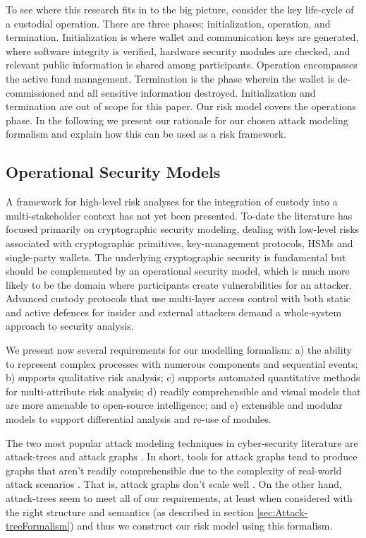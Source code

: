 \documentclass[runningheads]{llncs}
\begin{document}
To see where this research fits in to the big picture, consider the key life-cycle of a custodial operation. There are three phases; initialization, operation, and termination. Initialization is where wallet and communication keys are generated, where software integrity is verified, hardware security modules are checked, and relevant public information is shared among participants. Operation encompasses the active fund management. Termination is the phase wherein the wallet is de-commissioned and all sensitive information destroyed. Initialization and termination are out of scope for this paper. Our risk model covers the operations phase. In the following we present our rationale for our chosen attack modeling formalism and explain how this can be used as a risk framework.

\subsection{Operational Security Models}

A framework for high-level risk analyses for the integration of custody into a multi-stakeholder context has not yet been presented. To-date the literature has focused primarily on cryptographic security modeling, dealing with low-level risks associated with cryptographic primitives, key-management protocols, HSMs and single-party wallets. The underlying cryptographic security is fundamental but should be complemented by an operational security model, which is much more likely to be the domain where participants create vulnerabilities for an attacker. Advanced custody protocols that use multi-layer access control with both static and active defences for insider and external attackers demand a whole-system approach to security analysis.

We present now several requirements for our modelling formalism: a) the ability to represent complex processes with numerous components and sequential events; b) supports qualitative risk analysis; c) supports automated quantitative methods for multi-attribute risk analysis; d) readily comprehensible and visual models that are more amenable to open-source intelligence; and e) extensible and modular models to support differential analysis and re-use of modules.  

The two most popular attack modeling techniques in cyber-security literature are attack-trees and attack graphs \cite{AGraphATreeReview}. In short, tools for attack graphs tend to produce graphs that aren't readily comprehensible due to the complexity of real-world attack scenarios \cite{SurveyAttackModeling}. That is, attack graphs don't scale well \cite{AssetCentricAnalysis}. On the other hand, attack-trees seem to meet all of our requirements, at least when considered with the right structure and semantics (as described in section \ref{sec:Attack-treeFormalism}) and thus we construct our risk model using this formalism.
\end{document}

